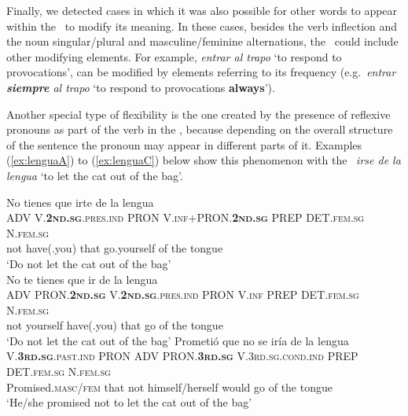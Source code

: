 \documentclass[output=paper]{langsci/langscibook}
\begin{document}
Finally, we detected cases in which it was also possible for other words to appear within the \mwe\ to modify its meaning.
In these cases, besides the verb inflection and the noun singular/plural and masculine/feminine alternations, the \mwe\ could include other modifying elements. 
For example, \textit{entrar al trapo} `to respond to provocations', can be modified by elements referring to its frequency (e.g.\ \textit{entrar \textbf{siempre} al trapo} `to respond to provocations \textbf{always}').

Another special type of flexibility is the one created by the presence of reflexive pronouns as part of the verb in the \mwe, because depending on the overall structure of the sentence the pronoun may appear in different parts of it.
Examples (\ref{ex:lenguaA}) to (\ref{ex:lenguaC}) below show this phenomenon with the \mwe\ \textit{irse de la lengua} `to let the cat out of the bag'.

\begin{exe}
\ex 
	\begin{xlist}
    \ex \label{ex:lenguaA}
	\glll No tienes que irte de la lengua\\
	\textsc{ADV} \textsc{V.\textbf{2nd.sg}.pres.ind} \textsc{PRON} \textsc{V.inf+{PRON}.\textbf{2nd.sg}} \footnotesize{PREP} \textsc{DET.fem.sg} \textsc{N.fem.sg} \\
    not {have(.you)} that go.yourself of the tongue\\
	\glt `Do not let the cat out of the bag' \\
	\ex \label{ex:lenguaB}
	\glll No te tienes que ir de la lengua\\
	\textsc{ADV} \textsc{PRON.\textbf{2nd.sg}} \textsc{V.\textbf{2nd.sg}.pres.ind} \textsc{PRON} \textsc{V.inf} \textsc{PREP} \textsc{DET.fem.sg} \textsc{N.fem.sg} \\
    not yourself {have(.you)} that go of the tongue\\
	\glt `Do not let the cat out of the bag'
    \ex \label{ex:lenguaC}
	\glll Prometió que no se iría de la lengua\\
	\textsc{V.\textbf{3rd.sg}.past.ind} \textsc{PRON} \textsc{ADV} \textsc{PRON.\textbf{3rd.sg}} \textsc{V.3rd.sg.cond.ind} \textsc{PREP} \textsc{DET.fem.sg} \textsc{N.fem.sg} \\
    {Promised.\textsc{masc/fem}} that not {himself/herself} {would go} of the tongue\\
	\glt `He/she promised not to let the cat out of the bag'
	\end{xlist}
\end{exe}
\end{document}
